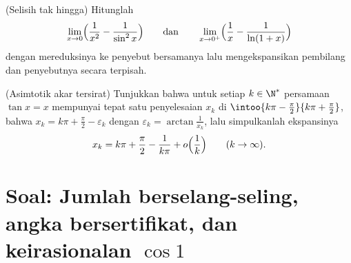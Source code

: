 \begin{exercise}[$\star\star$]\label{exo:b1:taylor:11}
(Selisih tak hingga) Hitunglah
\[
\lim_{x \to 0} \Bigl(\frac{1}{x^2} - \frac{1}{\sin^2 x}\Bigr)
\qquad\text{dan}\qquad
\lim_{x \to 0^+} \Bigl(\frac 1x - \frac{1}{\ln(1 + x)}\Bigr)
\]
dengan mereduksinya ke penyebut bersamanya lalu mengekspansikan pembilang dan
penyebutnya secara terpisah.
\end{exercise}

\begin{exercise}[$\star\star\star$]\label{exo:b1:taylor:12}
(Asimtotik akar tersirat) Tunjukkan bahwa untuk setiap $k \in
\N^*$ persamaan $\tan x = x$ mempunyai tepat satu penyelesaian $x_k$
di $\intoo{k\pi - \frac\pi2}{k\pi + \frac\pi2}$, bahwa $x_k = k\pi
+ \frac\pi2 - \varepsilon_k$ dengan $\varepsilon_k =
\arctan\frac{1}{x_k}$, lalu simpulkanlah ekspansinya
\[
x_k = k\pi + \frac\pi2 - \frac{1}{k\pi} + o\Bigl(\frac
1k\Bigr) \qquad (k \to \infty).
\]
\end{exercise}

\section{Soal: Jumlah berselang-seling, angka bersertifikat, dan
keirasionalan $\cos 1$}

